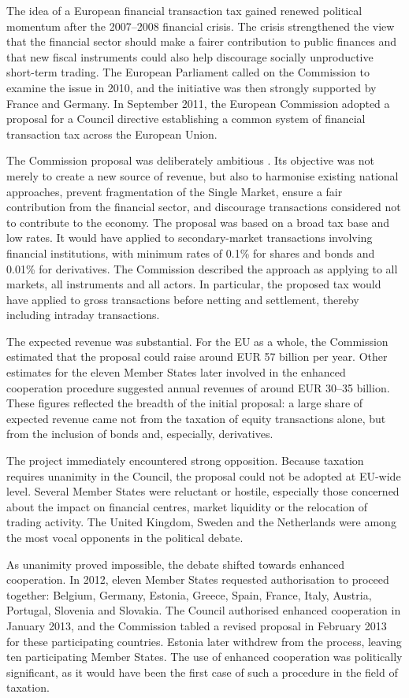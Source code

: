\documentclass[../../main]{subfiles}
\begin{document}
The idea of a European financial transaction tax gained renewed political momentum after the 2007--2008 financial crisis. The crisis strengthened the view that the financial sector should make a fairer contribution to public finances and that new fiscal instruments could also help discourage socially unproductive short-term trading. The European Parliament called on the Commission to examine the issue in 2010, and the initiative was then strongly supported by France and Germany. In September 2011, the European Commission adopted a proposal for a Council directive establishing a common system of financial transaction tax across the European Union.

The Commission proposal was deliberately ambitious \citep{Gabor2016}. Its objective was not merely to create a new source of revenue, but also to harmonise existing national approaches, prevent fragmentation of the Single Market, ensure a fair contribution from the financial sector, and discourage transactions considered not to contribute to the economy. The proposal was based on a broad tax base and low rates. It would have applied to secondary-market transactions involving financial institutions, with minimum rates of 0.1\% for shares and bonds and 0.01\% for derivatives. The Commission described the approach as applying to all markets, all instruments and all actors. In particular, the proposed tax would have applied to gross transactions before netting and settlement, thereby including intraday transactions.

The expected revenue was substantial. For the EU as a whole, the Commission estimated that the proposal could raise around EUR 57 billion per year. Other estimates for the eleven Member States later involved in the enhanced cooperation procedure suggested annual revenues of around EUR 30--35 billion. These figures reflected the breadth of the initial proposal: a large share of expected revenue came not from the taxation of equity transactions alone, but from the inclusion of bonds and, especially, derivatives.

The project immediately encountered strong opposition. Because taxation requires unanimity in the Council, the proposal could not be adopted at EU-wide level. Several Member States were reluctant or hostile, especially those concerned about the impact on financial centres, market liquidity or the relocation of trading activity. The United Kingdom, Sweden and the Netherlands were among the most vocal opponents in the political debate. 

As unanimity proved impossible, the debate shifted towards enhanced cooperation. In 2012, eleven Member States requested authorisation to proceed together: Belgium, Germany, Estonia, Greece, Spain, France, Italy, Austria, Portugal, Slovenia and Slovakia. The Council authorised enhanced cooperation in January 2013, and the Commission tabled a revised proposal in February 2013 for these participating countries. Estonia later withdrew from the process, leaving ten participating Member States. The use of enhanced cooperation was politically significant, as it would have been the first case of such a procedure in the field of taxation.
\end{document}
